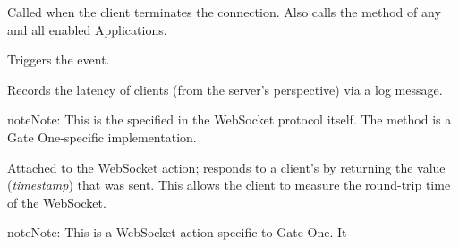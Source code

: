 \documentclass[letterpaper,10pt,openany]{sphinxmanual}
\begin{document}
\begin{fulllineitems}
\begin{fulllineitems}
\end{fulllineitems}


\begin{fulllineitems}
\label{Developer/server:gateone.core.server.ApplicationWebSocket.on_close}
Called when the client terminates the connection.  Also calls the
{\hyperref[Developer/server:gateone.core.server.ApplicationWebSocket.on_close]{}} method of any and all enabled Applications.

Triggers the  event.

\end{fulllineitems}


\begin{fulllineitems}
\label{Developer/server:gateone.core.server.ApplicationWebSocket.on_pong}
Records the latency of clients (from the server's perspective) via a
log message.

\begin{notice}{note}{Note:}
This is the  specified in the WebSocket protocol itself.
The {\hyperref[Developer/server:gateone.core.server.ApplicationWebSocket.pong]{}} method is a Gate One-specific implementation.
\end{notice}

\end{fulllineitems}


\begin{fulllineitems}
\label{Developer/server:gateone.core.server.ApplicationWebSocket.pong}
Attached to the  WebSocket action; responds to a client's
 by returning the value (\emph{timestamp}) that was sent.  This
allows the client to measure the round-trip time of the WebSocket.

\begin{notice}{note}{Note:}
This is a WebSocket action specific to Gate One. It
\end{notice}

\end{fulllineitems}


\end{fulllineitems}
\end{document}

